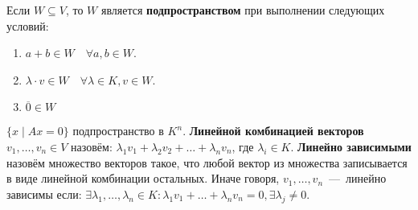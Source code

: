  Если $W\subseteq V$, то $W$ является \textbf{подпространством} при выполнении следующих условий:
\begin{enumerate}
    \item $a+b\in W \quad \forall a, b\in W$.
    \item $\lambda\cdot v \in W \quad \forall \lambda \in K, v\in W$.
    \item $\overline{0}\in W$
\end{enumerate}
\example
$\{x\mid Ax = 0\}$ подпространство в $K^n$.
 \textbf{Линейной комбинацией векторов} $v_1,\dots,v_n\in V$ назовём: $\lambda_1v_1 + \lambda_2v_2 + \dots + \lambda_nv_n$, где $\lambda_i\in K$.
 \textbf{Линейно зависимыми} назовём множество векторов такое, что любой вектор из множества
записывается в виде линейной комбинации остальных. Иначе говоря, $v_1,\dots,v_n$~---~линейно зависимы если:
$\exists \lambda_1,\dots,\lambda_n\in K: \lambda_1v_1 + \dots + \lambda_nv_n=0, \exists \lambda_j \not= 0$.
